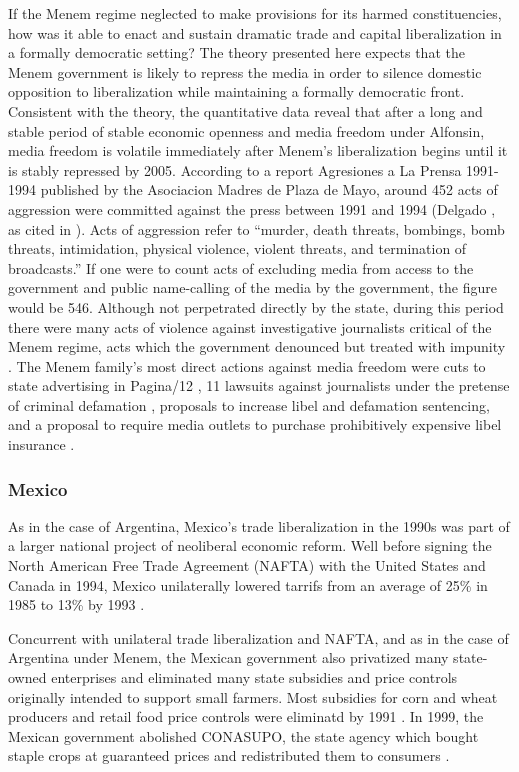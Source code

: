 \documentclass[12pt,a4paper]{article}\usepackage[]{graphicx}\usepackage[]{color}
\begin{document}
If the Menem regime neglected to make provisions for its harmed constituencies, how was it able to enact and sustain dramatic trade and capital liberalization in a formally democratic setting? The theory presented here expects that the Menem government is likely to repress the media in order to silence domestic opposition to liberalization while maintaining a formally democratic front. Consistent with the theory, the quantitative data reveal that after a long and stable period of stable economic openness and media freedom under Alfonsin, media freedom is volatile immediately after Menem's liberalization begins until it is stably repressed by 2005. According to a report Agresiones a La Prensa 1991-1994 published by the Asociacion Madres de Plaza de Mayo, around 452 acts of aggression were committed against the press between 1991 and 1994 (Delgado \cite*{Delgado:1995tr}, as cited in \cite[247]{Park:2002io}). Acts of aggression refer to “murder, death threats, bombings, bomb threats, intimidation, physical violence, violent threats, and termination of broadcasts.” If one were to count acts of excluding media from access to the government and public name-calling of the media by the government, the figure would be 546. Although not perpetrated directly by the state, during this period there were many acts of violence against investigative journalists critical of the Menem regime, acts which the government denounced but treated with impunity \parencite{Long:1993wb}. The Menem family's most direct actions against media freedom were cuts to state advertising in Pagina/12 \parencite[27]{Waisbord:1994kq}, 11 lawsuits against journalists under the pretense of criminal defamation \parencite{McCullough:1991cs}, proposals to increase libel and defamation sentencing, and a proposal to require media outlets to purchase prohibitively expensive libel insurance \parencite{Sims:kgMPqAHd}.

\subsubsection{Mexico}

As in the case of Argentina, Mexico's trade liberalization in the 1990s was part of a larger national project of neoliberal economic reform. Well before signing the North American Free Trade Agreement (NAFTA) with the United States and Canada in 1994, Mexico unilaterally lowered tarrifs from an average of 25\% in 1985 to 13\% by 1993 \parencites{McDaniel:2003kw}.

Concurrent with unilateral trade liberalization and NAFTA, and as in the case of Argentina under Menem, the Mexican government also privatized many state-owned enterprises and eliminated many state subsidies and price controls originally intended to support small farmers. Most subsidies for corn and wheat producers and retail food price controls were eliminatd by 1991 \parencite[295]{Hufbauer:2005vh}. In 1999, the Mexican government abolished CONASUPO, the state agency which bought staple crops at guaranteed prices and redistributed them to consumers \parencite[12]{Villareal:2010vk}.
\end{document}
